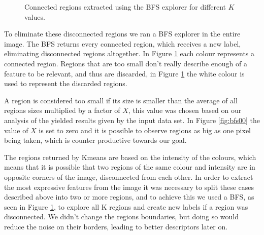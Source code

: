 \documentclass[12pt,a4paper]{article}
\begin{document}
\begin{figure}[!h]
{{		}
		\label{fig:bfs08}
	}
	\quad
	\caption{Connected regions extracted using the BFS explorer for different $K$ values.}
	\label{fig:bfs}
\end{figure}

	To eliminate these disconnected regions we ran a BFS explorer in the entire image. The BFS returns every connected region, which receives a new label, eliminating disconnected regions altogether. In Figure \ref{fig:bfs} each colour represents a connected region. Regions that are too small don't really describe enough of a feature to be relevant, and thus are discarded, in Figure \ref{fig:bfs} the white colour is used to represent the discarded regions.

	A region is considered too small if its size is smaller than the average of all regions sizes multiplied by a factor of $X$, this value was chosen based on our analysis of the yielded results given by the input data set. In Figure \ref{fig:bfs00} the value of $X$ is set to zero and it is possible to observe regions as big as one pixel being taken, which is counter productive towards our goal.

	The regions returned by Kmeans are based on the intensity of the colours, which means that it is possible that two regions of the same colour and intensity are in opposite corners of the image, disconnected from each other. In order to extract the most expressive features from the image it was necessary to split these cases described above into two or more regions, and to achieve this we used a BFS, as seen in Figure \ref{fig:bfs}, to explore all K regions and create new labels if a region was disconnected. We didn't change the regions boundaries, but doing so would reduce the noise on their borders, leading to better descriptors later on.
\end{document}
